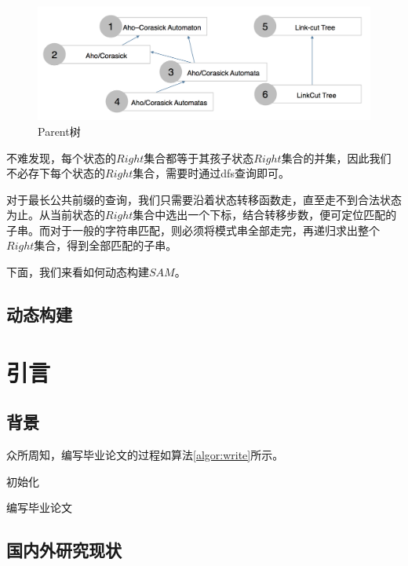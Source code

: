 ﻿\documentclass{sysuthesis}
\begin{document}
\begin{figure}[htbp]
	\centering
	\includegraphics[scale=0.3]{image/cdag.png}
	\caption{Parent树}\label{imag_partree}
\end{figure}

不难发现，每个状态的$Right$集合都等于其孩子状态$Right$集合的并集，因此我们不必存下每个状态的$Right$集合，需要时通过dfs查询即可。\par
对于最长公共前缀的查询，我们只需要沿着状态转移函数走，直至走不到合法状态为止。从当前状态的$Right$集合中选出一个下标，结合转移步数，便可定位匹配的子串。而对于一般的字符串匹配，则必须将模式串全部走完，再递归求出整个$Right$集合，得到全部匹配的子串。\par
下面，我们来看如何动态构建$SAM$。



\section{动态构建}







\chapter{引言}

\section{背景}

众所周知，编写毕业论文的过程如算法\ref{algor:write}所示。

\begin{algorithm}[H]
	初始化\;
	\caption{编写毕业论文}
	\label{algor:write}
\end{algorithm}

\section{国内外研究现状}
\end{document}
